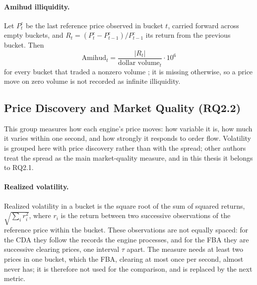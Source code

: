 \paragraph{Amihud illiquidity.} Let $P^{\mathrm{c}}_t$ be the last
reference price observed in bucket $t$, carried forward across empty
buckets, and $R_t = (P^{\mathrm{c}}_t - P^{\mathrm{c}}_{t-1})/P^{\mathrm{c}}_{t-1}$
its return from the previous bucket. Then
\begin{equation}
  \label{eq:amihud}
  \mathrm{Amihud}_t = \frac{|R_t|}{\text{dollar volume}_t} \cdot 10^{6}
\end{equation}
for every bucket that traded a nonzero volume \citep{amihud2002illiquidity};
it is missing otherwise, so a price move on zero volume is not recorded as
infinite illiquidity.

\subsection{Price Discovery and Market Quality (RQ2.2)}
\label{sec:formularq22}

This group measures how each engine's price moves: how variable it is,
how much it varies within one second, and how strongly it responds to
order flow. Volatility is grouped here with price discovery rather than
with the spread; other authors treat the spread as the main market-quality
measure, and in this thesis it belongs to RQ2.1.

\paragraph{Realized volatility.} Realized volatility in a bucket is the
square root of the sum of squared returns, $\sqrt{\sum_i r_i^2}$, where
$r_i$ is the return between two successive observations of the reference
price within the bucket. These observations are not equally spaced: for
the CDA they follow the records the engine processes, and for the FBA
they are successive clearing prices, one interval $\tau$ apart. The
measure needs at least two prices in one bucket, which the FBA, clearing
at most once per second, almost never has; it is therefore not used for
the comparison, and is replaced by the next metric.

